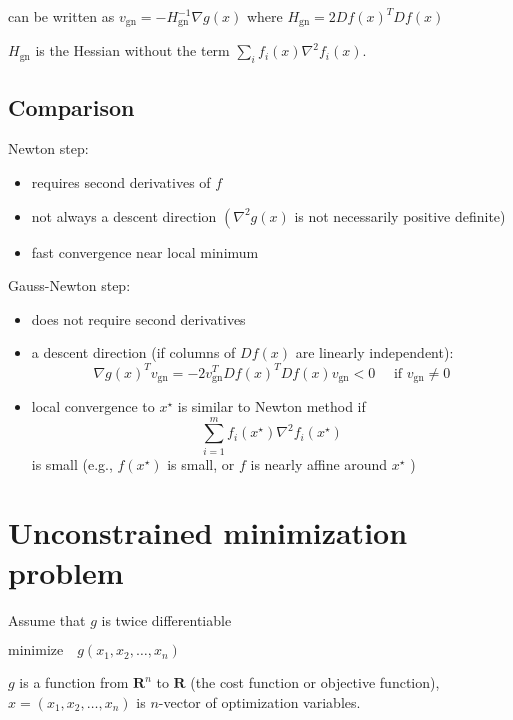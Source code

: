\begin{corollary}
    can be written as $ v_{\mathrm{gn}}=-H_{\mathrm{gn}}^{-1} \nabla g(x) $ where $ H_{\mathrm{gn}}=2 D f(x)^{T} D f(x) $

    $ H_{\mathrm{gn}} $ is the Hessian without the term $ \sum_{i} f_{i}(x) \nabla^{2} f_{i}(x) $.
\end{corollary}





\subsection{Comparison}

Newton step:
\begin{itemize}
    \item requires second derivatives of $ f $
    \item not always a descent direction $ \left(\nabla^{2} g(x)\right. $ is not necessarily positive definite)
    \item fast convergence near local minimum
\end{itemize}


Gauss-Newton step:
\begin{itemize}
    \item does not require second derivatives
    \item a descent direction (if columns of $ D f(x) $ are linearly independent):
    $$
    \nabla g(x)^{T} v_{\mathrm{gn}}=-2 v_{\mathrm{gn}}^{T} D f(x)^{T} D f(x) v_{\mathrm{gn}}<0 \quad \text { if } v_{\mathrm{gn}} \neq 0
    $$
    \item local convergence to $ x^{\star} $ is similar to Newton method if
$$
\sum_{i=1}^{m} f_{i}\left(x^{\star}\right) \nabla^{2} f_{i}\left(x^{\star}\right)
$$
is small (e.g., $ f\left(x^{\star}\right) $ is small, or $ f $ is nearly affine around $ x^{\star} $ )
\end{itemize}


\section{Unconstrained minimization problem}

\begin{problem}
    Assume that $ g $ is twice differentiable

    $\text{minimize} \quad g\left(x_{1}, x_{2}, \ldots, x_{n}\right) $

    $ g $ is a function from $ \mathbf{R}^{n} $ to $ \mathbf{R} $ (the cost function or objective function), $ x=\left(x_{1}, x_{2}, \ldots, x_{n}\right) $ is $ n $-vector of optimization variables.
\end{problem}

